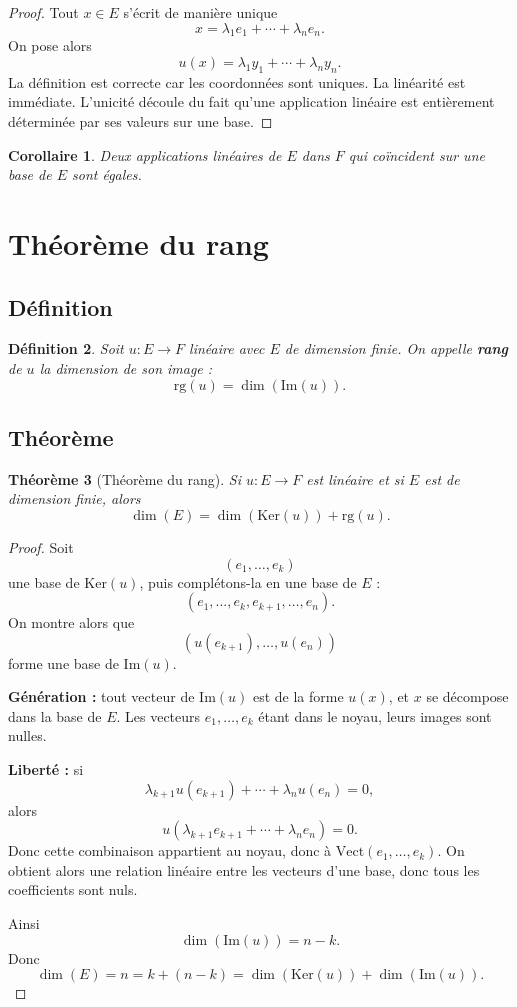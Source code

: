 \documentclass[11pt,a4paper]{article}
\newtheorem{definition}{Définition}[section]
\newtheorem{theoreme}[definition]{Théorème}
\newtheorem{corollaire}[definition]{Corollaire}
\theoremstyle{remark}
\newcommand{\Vect}{\mathrm{Vect}}
\newcommand{\Ker}{\mathrm{Ker}}
\newcommand{\Img}{\mathrm{Im}}
\newcommand{\rg}{\mathrm{rg}}
\begin{document}
\begin{proof}
Tout \(x\in E\) s’écrit de manière unique
\[
x=\lambda_1e_1+\cdots+\lambda_ne_n.
\]
On pose alors
\[
u(x)=\lambda_1y_1+\cdots+\lambda_ny_n.
\]
La définition est correcte car les coordonnées sont uniques. La linéarité est immédiate. L’unicité découle du fait qu’une application linéaire est entièrement déterminée par ses valeurs sur une base.
\end{proof}

\begin{corollaire}
Deux applications linéaires de \(E\) dans \(F\) qui coïncident sur une base de \(E\) sont égales.
\end{corollaire}

\section{Théorème du rang}

\subsection{Définition}

\begin{definition}
Soit \(u:E\to F\) linéaire avec \(E\) de dimension finie. On appelle \textbf{rang} de \(u\) la dimension de son image :
\[
\rg(u)=\dim(\Img(u)).
\]
\end{definition}

\subsection{Théorème}

\begin{theoreme}[Théorème du rang]
Si \(u:E\to F\) est linéaire et si \(E\) est de dimension finie, alors
\[
\dim(E)=\dim(\Ker(u))+\rg(u).
\]
\end{theoreme}

\begin{proof}
Soit
\[
(e_1,\dots,e_k)
\]
une base de \(\Ker(u)\), puis complétons-la en une base de \(E\) :
\[
(e_1,\dots,e_k,e_{k+1},\dots,e_n).
\]
On montre alors que
\[
(u(e_{k+1}),\dots,u(e_n))
\]
forme une base de \(\Img(u)\).

\textbf{Génération :} tout vecteur de \(\Img(u)\) est de la forme \(u(x)\), et \(x\) se décompose dans la base de \(E\). Les vecteurs \(e_1,\dots,e_k\) étant dans le noyau, leurs images sont nulles.

\textbf{Liberté :} si
\[
\lambda_{k+1}u(e_{k+1})+\cdots+\lambda_nu(e_n)=0,
\]
alors
\[
u(\lambda_{k+1}e_{k+1}+\cdots+\lambda_ne_n)=0.
\]
Donc cette combinaison appartient au noyau, donc à \(\Vect(e_1,\dots,e_k)\). On obtient alors une relation linéaire entre les vecteurs d’une base, donc tous les coefficients sont nuls.

Ainsi
\[
\dim(\Img(u))=n-k.
\]
Donc
\[
\dim(E)=n=k+(n-k)=\dim(\Ker(u))+\dim(\Img(u)).
\]
\end{proof}
\end{document}
